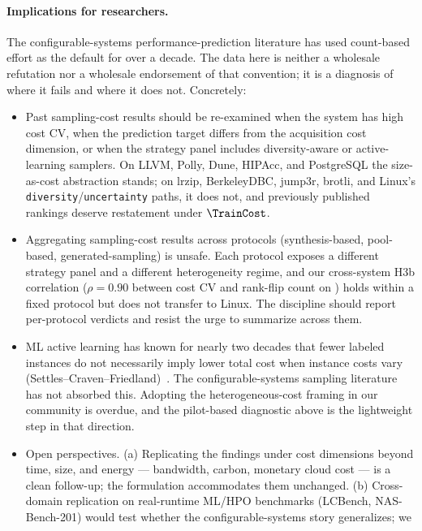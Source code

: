 \paragraph*{Implications for researchers.}
The configurable-systems performance-prediction literature has used
count-based effort as the default for over a decade. The data here is
neither a wholesale refutation nor a wholesale endorsement of that
convention; it is a diagnosis of where it fails and where it does
not. Concretely:
\begin{itemize}
    \item Past sampling-cost results should be re-examined when the
    system has high cost CV, when the prediction target differs from
    the acquisition cost dimension, or when the strategy panel
    includes diversity-aware or active-learning samplers. On
    LLVM, Polly, Dune, HIPAcc, and PostgreSQL the size-as-cost
    abstraction stands; on lrzip, BerkeleyDBC, jump3r, brotli, and
    Linux's \texttt{diversity}/\texttt{uncertainty} paths, it does
    not, and previously published rankings deserve restatement under
    $\TrainCost$.
    \item Aggregating sampling-cost results across protocols
    (synthesis-based, pool-based, generated-sampling) is unsafe.
    Each protocol exposes a different strategy panel and a different
    heterogeneity regime, and our cross-system H3b correlation
    ($\rho\!=\!0.90$ between cost CV and rank-flip count on \StudyReplication)
    holds within a fixed protocol but does not transfer to Linux. The
    discipline should report per-protocol verdicts and resist the
    urge to summarize across them.
    \item ML active learning has known for nearly two decades that
    fewer labeled instances do not necessarily imply lower total
    cost when instance costs vary
    (Settles--Craven--Friedland)~\red{[bib]}. The configurable-systems
    sampling literature has not absorbed this. Adopting the
    heterogeneous-cost framing in our community is overdue, and the
    pilot-based diagnostic above is the lightweight step in that
    direction.
    \item Open perspectives. (a) Replicating the findings under cost
    dimensions beyond time, size, and energy --- bandwidth, carbon,
    monetary cloud cost --- is a clean follow-up; the formulation
    accommodates them unchanged. (b) Cross-domain replication on
    real-runtime ML/HPO benchmarks (LCBench, NAS-Bench-201) would
    test whether the configurable-systems story generalizes; we

\end{itemize}
